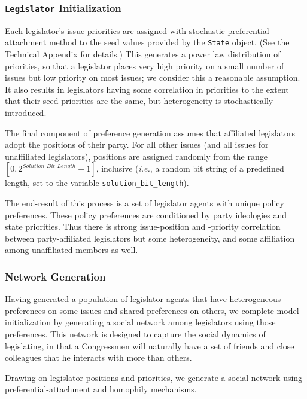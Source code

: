 \documentclass[pdftex,12pt]{llncs}
\begin{document}
\subsubsection{\texttt{Legislator} Initialization}
Each legislator's issue priorities are assigned with stochastic preferential attachment method to the seed values provided by the \texttt{State} object. (See the Technical Appendix for details.)  
This generates a power law distribution of priorities, so that a legislator places very high priority on a small number of issues but low priority on most issues; we consider this a reasonable assumption.  It also results in legislators having some correlation in priorities to the extent that their seed priorities are the same, but heterogeneity is stochastically introduced.

The final component of preference generation assumes that affiliated legislators adopt the positions of their party.  For all other issues (and all issues for unaffiliated legislators), positions are assigned randomly from the range $[0, 2^{Solution\_Bit\_Length} - 1]$, inclusive (\textit{i.e.}, a random bit string of a predefined length, set to the variable \texttt{solution\_bit\_length}).  

The end-result of this process is a set of legislator agents with unique policy preferences.  These policy preferences are conditioned by party ideologies and state priorities.  Thus there is strong issue-position and -priority correlation between party-affiliated legislators but some heterogeneity, and some affiliation among unaffiliated members as well.

\subsubsection{Network Generation}
Having generated a population of legislator agents that have heterogeneous preferences on some issues and shared preferences on others, we complete model initialization by generating a social network among legislators using those preferences.
This network is designed to capture the social dynamics of legislating, in that a Congressmen will naturally have a set of friends and close colleagues that he interacts with more than others.

Drawing on legislator positions and priorities, we generate a social network using preferential-attachment and homophily mechanisms.
\end{document}
